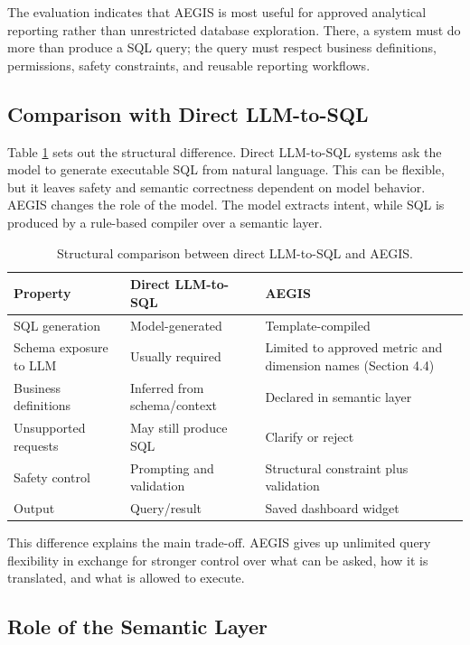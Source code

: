 \documentclass[pdflatex,sn-mathphys-num]{sn-jnl}
\begin{document}
The evaluation indicates that AEGIS is most useful for approved analytical reporting rather than unrestricted database exploration. There, a system must do more than produce a SQL query; the query must respect business definitions, permissions, safety constraints, and reusable reporting workflows.


\subsection{Comparison with Direct LLM-to-SQL}

Table \ref{tab:8} sets out the structural difference. Direct LLM-to-SQL systems ask the model to generate executable SQL from natural language. This can be flexible, but it leaves safety and semantic correctness dependent on model behavior. AEGIS changes the role of the model. The model extracts intent, while SQL is produced by a rule-based compiler over a semantic layer.


\begin{table}[t]
\caption{Structural comparison between direct LLM-to-SQL and AEGIS.}
\label{tab:8}
\centering
\renewcommand{\arraystretch}{1.15}
\begin{tabular}{p{}p{}p{}}
\toprule
Property & Direct LLM-to-SQL & AEGIS \\
\midrule
SQL generation & Model-generated & Template-compiled \\
Schema exposure to LLM & Usually required & Limited to approved metric and dimension names (Section 4.4) \\
Business definitions & Inferred from schema/context & Declared in semantic layer \\
Unsupported requests & May still produce SQL & Clarify or reject \\
Safety control & Prompting and validation & Structural constraint plus validation \\
Output & Query/result & Saved dashboard widget \\
\bottomrule
\end{tabular}
\end{table}

This difference explains the main trade-off. AEGIS gives up unlimited query flexibility in exchange for stronger control over what can be asked, how it is translated, and what is allowed to execute.


\subsection{Role of the Semantic Layer}
\end{document}
